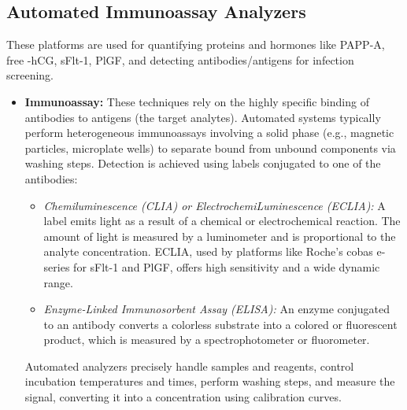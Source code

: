 \documentclass{article}
\begin{document}
\subsection{Automated Immunoassay Analyzers}
These platforms are used for quantifying proteins and hormones like PAPP-A, free \textbeta-hCG, sFlt-1, PlGF, and detecting antibodies/antigens for infection screening.
\begin{itemize}
    \item \textbf{Immunoassay:} These techniques rely on the highly specific binding of antibodies to antigens (the target analytes). Automated systems typically perform heterogeneous immunoassays involving a solid phase (e.g., magnetic particles, microplate wells) to separate bound from unbound components via washing steps. Detection is achieved using labels conjugated to one of the antibodies:
    \begin{itemize}
        \item \textit{Chemiluminescence (CLIA) or ElectrochemiLuminescence (ECLIA):} A label emits light as a result of a chemical or electrochemical reaction. The amount of light is measured by a luminometer and is proportional to the analyte concentration. ECLIA, used by platforms like Roche's cobas e-series for sFlt-1 and PlGF, offers high sensitivity and a wide dynamic range.
        \item \textit{Enzyme-Linked Immunosorbent Assay (ELISA):} An enzyme conjugated to an antibody converts a colorless substrate into a colored or fluorescent product, which is measured by a spectrophotometer or fluorometer.
    \end{itemize}
    Automated analyzers precisely handle samples and reagents, control incubation temperatures and times, perform washing steps, and measure the signal, converting it into a concentration using calibration curves.
\end{itemize}
\end{document}
